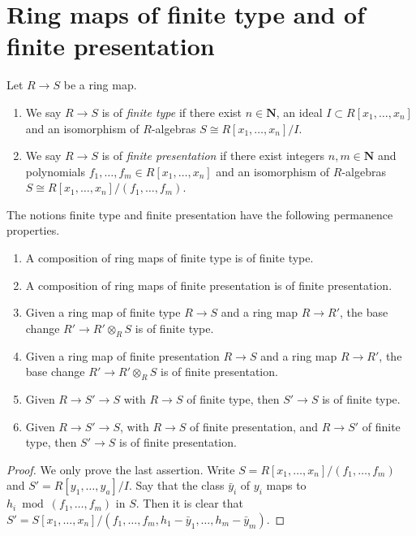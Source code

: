 \section{Ring maps of finite type and of finite presentation}
\label{section-finite-type}

\begin{definition}
\label{definition-finite-type}
Let $R \to S$ be a ring map.
\begin{enumerate}
\item We say $R \to S$ is of {\it finite type} if there exist
$n \in \mathbf{N}$, an ideal $I \subset R[x_1, \ldots, x_n]$ and
an isomorphism of $R$-algebras $S \cong R[x_1, \ldots, x_n]/I$.
\item We say $R \to S$ is of {\it finite presentation} if there
exist integers $n, m \in \mathbf{N}$ and polynomials
$f_1, \ldots, f_m \in R[x_1, \ldots, x_n]$
and an isomorphism of $R$-algebras
$S \cong R[x_1, \ldots, x_n]/(f_1, \ldots, f_m)$.
\end{enumerate}
\end{definition}

\begin{lemma}
\label{lemma-compose-finite-type}
The notions finite type and finite presentation have the following
permanence properties.
\begin{enumerate}
\item A composition of ring maps of finite type is of finite type.
\item A composition of ring maps of finite presentation is of finite
presentation.
\item Given a ring map of finite type $R \to S$ and a ring map $R \to R'$,
the base change $R' \to R' \otimes_R S$ is of finite type.
\item Given a ring map of finite presentation $R \to S$
and a ring map $R \to R'$, the base change $R' \to R' \otimes_R S$
is of finite presentation.
\item Given $R \to S' \to S$ with $R \to S$ of finite type,
then $S' \to S$ is of finite type.
\item Given $R \to S' \to S$, with $R \to S$ of finite presentation,
and $R \to S'$ of finite type, then $S' \to S$ is of finite presentation.
\end{enumerate}
\end{lemma}

\begin{proof}
We only prove the last assertion.
Write $S = R[x_1, \ldots, x_n]/(f_1, \ldots, f_m)$
and $S' = R[y_1, \ldots, y_a]/I$. Say that the class
$\bar y_i$ of $y_i$ maps
to $h_i \bmod (f_1, \ldots, f_m)$ in $S$.
Then it is clear that
$S' = S[x_1, \ldots, x_n]/(f_1, \ldots, f_m,
h_1 - \bar y_1, \ldots, h_m - \bar y_m)$.
\end{proof}

